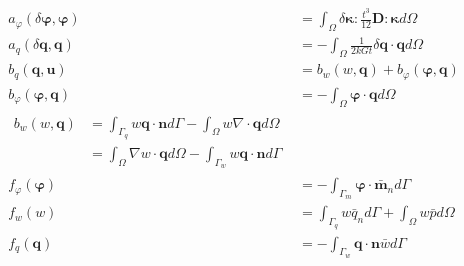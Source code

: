 \begin{align}
a_\varphi(\delta\boldsymbol \varphi,\boldsymbol \varphi) &= \int_\Omega \delta \boldsymbol \kappa : \frac{t^3}{12} \boldsymbol D : \boldsymbol \kappa d\Omega \\
a_q(\delta\boldsymbol q,\boldsymbol q) &= -\int_\Omega \frac{1}{2kGt} \delta \boldsymbol q \cdot \boldsymbol q d\Omega \\
b_q(\boldsymbol q, \boldsymbol u) &= b_w(w, \boldsymbol q) + b_\varphi(\boldsymbol \varphi, \boldsymbol q) \\
b_{\varphi}(\boldsymbol \varphi, \boldsymbol q) &= -\int_{\Omega}\boldsymbol \varphi \cdot \boldsymbol q d\Omega \\
\begin{split}
b_{w}(w,\boldsymbol q) &= \int_{\Gamma_{q}} w \boldsymbol q \cdot \boldsymbol nd\Gamma - \int_{\Omega}w \nabla \cdot \boldsymbol qd\Omega \\
&= \int_\Omega \nabla w \cdot \boldsymbol q d\Omega - \int_{\Gamma_w} w \boldsymbol q \cdot \boldsymbol n d\Gamma
\end{split} \\
f_{\varphi}(\boldsymbol \varphi) &= - \int_{\Gamma_{m}} \boldsymbol \varphi \cdot \bar{\boldsymbol m}_n d\Gamma \\
f_{w}(w) &= \int_{\Gamma_{q}} w \bar{q}_n d\Gamma + \int_{\Omega}w \bar{p} d\Omega \\
f_{q}(\boldsymbol q) &= - \int_{\Gamma_{w}} \boldsymbol q \cdot \boldsymbol n \bar{w} d\Gamma
\end{align}

